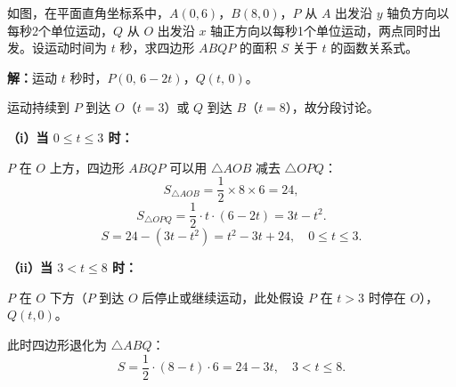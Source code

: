 \documentclass[12pt, a4paper]{ctexart}
\begin{document}
\begin{examplebox}
如图，在平面直角坐标系中，$A(0,6)$，$B(8,0)$，$P$ 从 $A$ 出发沿 $y$ 轴负方向以每秒2个单位运动，$Q$ 从 $O$ 出发沿 $x$ 轴正方向以每秒1个单位运动，两点同时出发。设运动时间为 $t$ 秒，求四边形 $ABQP$ 的面积 $S$ 关于 $t$ 的函数关系式。

\begin{center}
\end{center}

\textbf{解：}运动 $t$ 秒时，$P(0,\,6-2t)$，$Q(t,\,0)$。

运动持续到 $P$ 到达 $O$（$t=3$）或 $Q$ 到达 $B$（$t=8$），故分段讨论。

\textbf{（i）当 $0\le t\le 3$ 时：}

$P$ 在 $O$ 上方，四边形 $ABQP$ 可以用 $\triangle AOB$ 减去 $\triangle OPQ$：
\[S_{\triangle AOB}=\frac{1}{2}\times 8\times 6=24,\]
\[S_{\triangle OPQ}=\frac{1}{2}\cdot t\cdot(6-2t)=3t-t^2.\]
\[\boxed{S=24-(3t-t^2)=t^2-3t+24,\quad 0\le t\le 3.}\]

\textbf{（ii）当 $3<t\le 8$ 时：}

$P$ 在 $O$ 下方（$P$ 到达 $O$ 后停止或继续运动，此处假设 $P$ 在 $t>3$ 时停在 $O$），$Q(t,0)$。

此时四边形退化为 $\triangle ABQ$：
\[\boxed{S=\frac{1}{2}\cdot(8-t)\cdot 6=24-3t,\quad 3<t\le 8.}\]
\end{examplebox}
\end{document}
